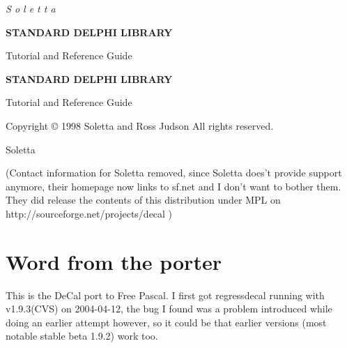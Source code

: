 \documentclass{report}
\begin{document}
\vspace*{\fill} \c
{\large {\it S o l e t t a}}

\vspace{1cm}
 
\begin{center}
{\Huge \textbf{STANDARD DELPHI LIBRARY}}

\vspace{1cm}

{\huge Tutorial and Reference Guide}

\end{center}
\vspace*{\fill}
\newpage

\begin{center}
\vspace*{\fill} \c
{\huge \textbf{STANDARD DELPHI LIBRARY}}

{\huge Tutorial and Reference Guide} 

\vspace{2cm}

{\large Copyright \copyright{} 1998 Soletta and Ross Judson All rights reserved.} 

{\large Soletta}

\vspace{1cm}

(Contact information for Soletta removed, since Soletta does't provide
support anymore, their homepage now links to sf.net and I don't want to
bother them. They did release the contents of this distribution under MPL on
http://sourceforge.net/projects/decal )

%
%
%
%

\end{center}

\vspace*{\fill} 
\newpage
\tableofcontents
\newpage

\chapter{Word from the porter}

This is the DeCal port to Free Pascal. I first got regressdecal running with
v1.9.3(CVS) on 2004-04-12, the bug I found was a problem introduced while
doing an earlier attempt however, so it could be that earlier versions (most
notable stable beta 1.9.2) work too.
\end{document}
